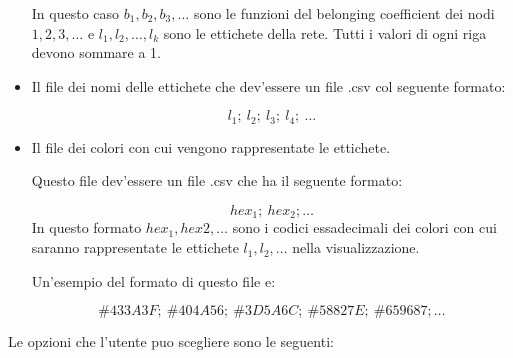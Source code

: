 \documentclass[a4paper,12pt]{report}
\begin{document}
\begin{itemize}
				In questo caso $b_1, b_2, b_3, \dots$ sono le funzioni del belonging coefficient dei nodi $1, 2, 3, \dots$ e $l_1, l_2, \dots, l_k$ sono le ettichete della rete. Tutti i valori di ogni riga devono sommare a 1. 
				

				\item Il file dei nomi delle ettichete che dev'essere un file .csv col seguente formato: 

				\begin{equation}
				l_1;\ l_2;\ l_3;\ l_4;\ \dots
				\end{equation}

				\item Il file dei colori con cui vengono rappresentate le ettichete. 

				Questo file dev'essere un file .csv che ha il seguente formato: 

				\begin{equation}
				hex_1;\ hex_2; \dots
				\end{equation}
				In questo formato $hex_1, hex2, \dots$ sono i codici essadecimali dei colori con cui saranno rappresentate le ettichete $l_1, l_2, \dots$ nella visualizzazione. 

				Un'esempio del formato di questo file e: 

				\begin{equation}
				\#433A3F;\ \#404A56;\ \#3D5A6C;\ \#58827E;\ \#659687; \dots
				\end{equation}
			\end{itemize}
			Le opzioni che l'utente puo scegliere sono le seguenti:
\end{document}
